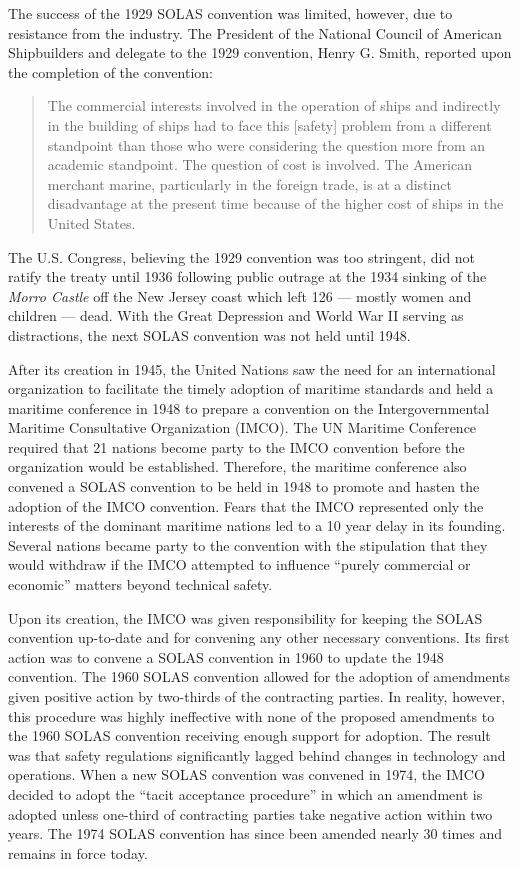 \documentclass[twoside,symmetric,notoc]{tufte-book}
\begin{document}
\par{%
The success of the 1929 SOLAS convention was limited, however, due to resistance from the industry. The President of the National Council of American Shipbuilders and delegate to the 1929 convention, Henry G. Smith, reported upon the completion of the convention:
\begin{quotation}
The commercial interests involved in the operation of ships and indirectly in the building of ships had to face this [safety] problem from a different standpoint than those who were considering the question more from an academic standpoint. The question of cost is involved. The American merchant marine, particularly in the foreign trade, is at a distinct disadvantage at the present time because of the higher cost of ships in the United States.
\end{quotation}
The U.S. Congress, believing the 1929 convention was too stringent, did not ratify the treaty until 1936 following public outrage at the 1934 sinking of the \textit{Morro Castle} off the New Jersey coast which left 126 --- mostly women and children --- dead.\cite{Schumacher} With the Great Depression and World War II serving as distractions, the next SOLAS convention was not held until 1948.
}
\par{%
After its creation in 1945, the United Nations saw the need for an international organization to facilitate the timely adoption of maritime standards and held a maritime conference in 1948 to prepare a convention on the Intergovernmental Maritime Consultative Organization (IMCO). The UN Maritime Conference required that 21 nations become party to the IMCO convention before the organization would be established.\cite{Mitroussi} Therefore, the maritime conference also convened a SOLAS convention to be held in 1948 to promote and hasten the adoption of the IMCO convention. Fears that the IMCO represented only the interests of the dominant maritime nations led to a 10 year delay in its founding. Several nations became party to the convention with the stipulation that they would withdraw if the IMCO attempted to influence ``purely commercial or economic'' matters beyond technical safety.\cite{IMO}
}
\par{%
Upon its creation, the IMCO was given responsibility for keeping the SOLAS convention up-to-date and for convening any other necessary conventions. Its first action was to convene a SOLAS convention in 1960 to update the 1948 convention. The 1960 SOLAS convention allowed for the adoption of amendments given positive action by two-thirds of the contracting parties.\cite{Gutierrez} In reality, however, this procedure was highly ineffective with none of the proposed amendments to the 1960 SOLAS convention receiving enough support for adoption. The result was that safety regulations significantly lagged behind changes in technology and operations. When a new SOLAS convention was convened in 1974, the IMCO decided to adopt the ``tacit acceptance procedure'' in which an amendment is adopted unless one-third of contracting parties take negative action within two years.\cite{Lansford} The 1974 SOLAS convention has since been amended nearly 30 times and remains in force today.\cite{Zacharias} 
}
\end{document}

